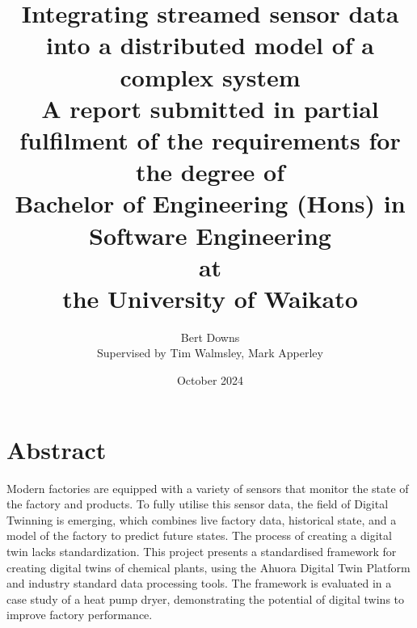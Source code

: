 \documentclass[12pt]{report}
\title{Integrating streamed sensor data into a distributed model of a complex system \\
\large{A report submitted in partial fulfilment of the requirements for the degree of \\
\textbf{Bachelor of Engineering (Hons) in Software Engineering} \\
at \\
\textbf{the University of Waikato}
}}
\author{Bert Downs  \\ 
Supervised by Tim Walmsley, Mark Apperley }
\date{October 2024}
\begin{document}

\maketitle


\chapter*{Abstract}

Modern factories are equipped with a variety of sensors that monitor the state of the factory and products. To fully utilise this sensor data, the field of Digital Twinning is emerging, which combines live factory data, historical state, and a model of the factory to predict future states. The process of creating a digital twin lacks standardization. This project presents a standardised framework for creating digital twins of chemical plants, using the Ahuora Digital Twin Platform and industry standard data processing tools. The framework is evaluated in a case study of a heat pump dryer, demonstrating the potential of digital twins to improve factory performance.
\end{document}
